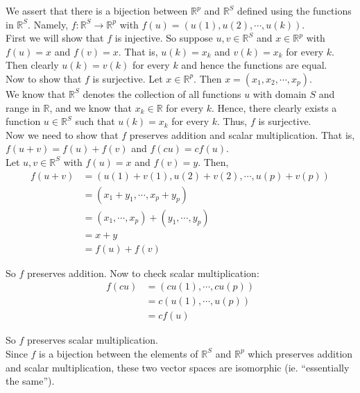 \documentclass[12pt]{article}
\begin{document}
We assert that there is a bijection between $\mathbb{R}^p$ and $\mathbb{R}^S$ defined using the functions in $\mathbb{R}^S$. Namely, $f: \mathbb{R}^S \to \mathbb{R}^p$ with $f(u) = (u(1), u(2), \cdots, u(k))$.\\

First we will show that $f$ is injective. So suppose $u, v \in \mathbb{R}^S$ and $x \in \mathbb{R}^p$ with $f(u) = x$ and $f(v) = x$. That is, $u(k) = x_k$ and $v(k) = x_k$ for every $k$. Then clearly $u(k) = v(k)$ for every $k$ and hence the functions are equal.\\

Now to show that $f$ is surjective. Let $x \in \mathbb{R}^p$. Then $x = (x_1, x_2, \cdots, x_p)$.\\

We know that $\mathbb{R}^S$ denotes the collection of all functions $u$ with domain $S$ and range in $\mathbb{R}$, and we know that $x_k \in \mathbb{R}$ for every $k$. Hence, there clearly exists a function $u \in \mathbb{R}^S$ such that $u(k) = x_k$ for every $k$. Thus, $f$ is surjective.\\

Now we need to show that $f$ preserves addition and scalar multiplication. That is, $f(u + v) = f(u) + f(v)$ and $f(cu) = cf(u)$.\\

Let $u, v \in \mathbb{R}^S$ with $f(u) = x$ and $f(v) = y$. Then,
\begin{align*}
f(u + v) &= (u(1) + v(1), u(2) + v(2), \cdots, u(p) + v(p))\\
&= (x_1 + y_1, \cdots, x_p + y_p)\\
&= (x_1, \cdots, x_p) + (y_1, \cdots, y_p)\\
&= x + y\\
&= f(u) + f(v)
\end{align*}

So $f$ preserves addition. Now to check scalar multiplication:
\begin{align*}
f(cu) &= (cu(1), \cdots, cu(p))\\
&= c(u(1), \cdots, u(p))\\
&= cf(u)
\end{align*}

So $f$ preserves scalar multiplication.\\

Since $f$ is a bijection between the elements of $\mathbb{R}^S$ and $\mathbb{R}^p$ which preserves addition and scalar multiplication, these two vector spaces are isomorphic (ie. ``essentially the same'').
\end{document}
